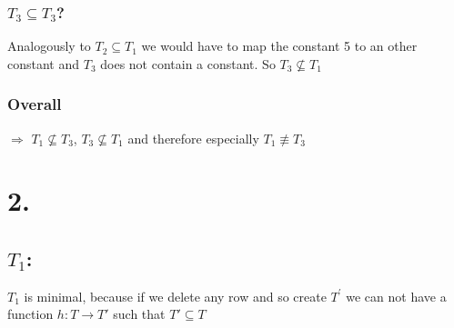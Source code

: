 \documentclass[12pt]{article}
\begin{document}
	\subsubsection*{$T_3 \subseteq T_3$?}
	Analogously to $T_2 \subseteq T_1$ we would have to map the constant 5 to an other constant and $T_3$ does not contain a constant. So $T_3 \not \subseteq T_1$
	\subsubsection*{Overall}
	$\Rightarrow$ $T_1\not\subseteq T_3$, $T_3 \not\subseteq T_1$ and therefore especially $T_1 \not\equiv T_3$ 
	
	\section*{2.}
	\subsection*{$T_1$:}
	$T_1$ is minimal, because if we delete any row and so create $T^\prime$ we can not have a function $h:T\rightarrow T'$ such that $T'\subseteq T$
	
\end{document}
